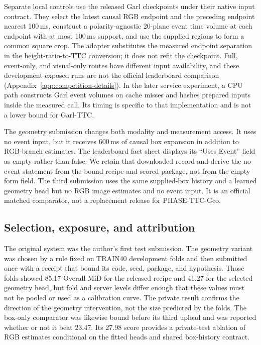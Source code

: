 Separate local controls use the released Garl checkpoints under their native input contract. They select the latest causal RGB endpoint and the preceding endpoint nearest 100\,ms, construct a polarity-agnostic 20-plane event time volume at each endpoint with at most 100\,ms support, and use the supplied regions to form a common square crop. The adapter substitutes the measured endpoint separation in the height-ratio-to-TTC conversion; it does not refit the checkpoint. Full, event-only, and visual-only routes have different input availability, and these development-exposed runs are not the official leaderboard comparison (Appendix~\ref{app:competition-details}). In the later service experiment, a CPU path constructs Garl event volumes on cache misses and hashes prepared inputs inside the measured call. Its timing is specific to that implementation and is not a lower bound for Garl-TTC.

The geometry submission changes both modality and measurement access. It uses no event input, but it receives 600\,ms of causal box expansion in addition to RGB-branch estimates. The leaderboard fact sheet displays its ``Uses Event'' field as empty rather than false. We retain that downloaded record and derive the no-event statement from the bound recipe and scored package, not from the empty form field. The third submission uses the same supplied-box history and a learned geometry head but no RGB image estimates and no event input. It is an official matched comparator, not a replacement release for PHASE-TTC-Geo.

\subsection{Selection, exposure, and attribution}

The original system was the author's first test submission. The geometry variant was chosen by a rule fixed on TRAIN40 development folds and then submitted once with a receipt that bound its code, seed, package, and hypothesis. Those folds showed 85.17 Overall MiD for the released recipe and 41.27 for the selected geometry head, but fold and server levels differ enough that these values must not be pooled or used as a calibration curve. The private result confirms the direction of the geometry intervention, not the size predicted by the folds. The box-only comparator was likewise bound before its third upload and was reported whether or not it beat 23.47. Its 27.98 score provides a private-test ablation of RGB estimates conditional on the fitted heads and shared box-history contract.

